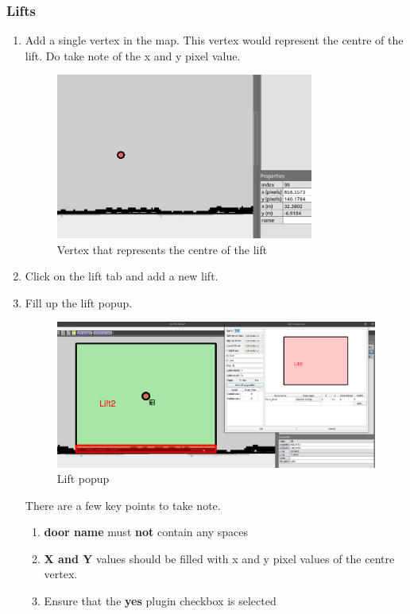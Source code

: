 \documentclass[11pt]{article}
\begin{document}
\subsubsection{Lifts}
\begin{enumerate}
 \item {
       Add a single vertex in the map. This vertex would represent the centre of the lift.
       Do take note of the x and y pixel value.
       \begin{figure}[H]
        \centering
        \includegraphics[width=0.8\textwidth]{images/lift_centre}
        \caption{Vertex that represents the centre of the lift}
       \end{figure}
       }
 \item {
       Click on the lift tab and add a new lift.
       }
 \item {
       Fill up the lift popup.
       \begin{figure}[H]
        \centering
        \includegraphics[width=1.0\textwidth]{images/lift_filled}
        \caption{Lift popup}
       \end{figure}
       There are a few key points to take note.
       \begin{enumerate}
        \item {\textbf{door name} must \textbf{not} contain any spaces}
        \item {\textbf{X and Y} values should be filled with x and y pixel values of the centre vertex. }
        \item {Ensure that the \textbf{yes} plugin checkbox is selected }

       \end{enumerate}

       }
\end{enumerate}
\end{document}

